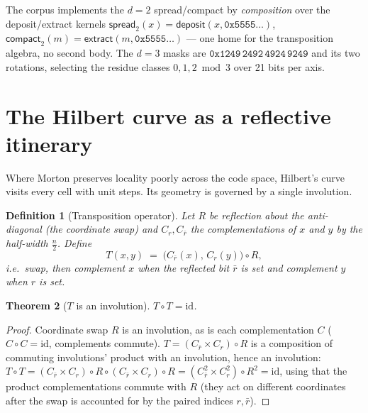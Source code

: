 \documentclass[11pt,a4paper]{report}
\newtheorem{theorem}{Theorem}[chapter]
\newtheorem{definition}[theorem]{Definition}
\begin{document}
The corpus implements the $d=2$ spread/compact by \emph{composition}
over the deposit/extract kernels
$\mathsf{spread}_2(x) = \mathsf{deposit}(x, \mathtt{0x5555\ldots})$,
$\mathsf{compact}_2(m) = \mathsf{extract}(m, \mathtt{0x5555\ldots})$
--- one home for the transposition algebra, no second body. The $d=3$
masks are $\mathtt{0x1249\,2492\,4924\,9249}$ and its two rotations,
selecting the residue classes $0,1,2 \bmod 3$ over 21 bits per axis.

\section{The Hilbert curve as a reflective itinerary}

Where Morton preserves locality poorly across the code space, Hilbert's
curve visits every cell with unit steps. Its geometry is governed by a
single involution.

\begin{definition}[Transposition operator]
Let $R$ be reflection about the anti-diagonal (the coordinate swap) and
$C_r, C_{\bar r}$ the complementations of $x$ and $y$ by the half-width
$\tfrac{n}{2}$. Define
\begin{equation}
T(x, y) \;=\; \bigl(C_{\bar r}(x),\, C_{r}(y)\bigr) \circ R ,
\end{equation}
i.e.\ swap, then complement $x$ when the reflected bit $\bar r$ is set
and complement $y$ when $r$ is set.
\end{definition}

\begin{theorem}[$T$ is an involution]\label{thm:hilbert-involution}
$T \circ T = \mathrm{id}$.
\end{theorem}

\begin{proof}
Coordinate swap $R$ is an involution, as is each complementation
$C$ ($C \circ C = \mathrm{id}$, complements commute). $T = (C_{\bar r}
\times C_r) \circ R$ is a composition of commuting involutions' product
with an involution, hence an involution:
$T \circ T = (C_{\bar r} \times C_r)\circ R \circ (C_{\bar r}\times C_r)
\circ R = (C_{\bar r}^2 \times C_r^2) \circ R^2 = \mathrm{id}$, using
that the product complementations commute with $R$ (they act on
different coordinates after the swap is accounted for by the paired
indices $r, \bar r$).
\end{proof}
\end{document}
